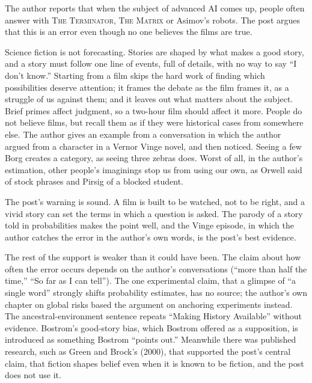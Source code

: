 \begin{afterword}
\summaryhead

The author reports that when the subject of advanced AI comes up, people often answer with \textsc{The Terminator}, \textsc{The Matrix} or Asimov's robots. The post argues that this is an error even though no one believes the films are true.

Science fiction is not forecasting. Stories are shaped by what makes a good story, and a story must follow one line of events, full of details, with no way to say ``I don't know.'' Starting from a film skips the hard work of finding which possibilities deserve attention; it frames the debate as the film frames it, as a struggle of us against them; and it leaves out what matters about the subject. Brief primes affect judgment, so a two-hour film should affect it more. People do not believe films, but recall them as if they were historical cases from somewhere else. The author gives an example from a conversation in which the author argued from a character in a Vernor Vinge novel, and then noticed. Seeing a few Borg creates a category, as seeing three zebras does. Worst of all, in the author's estimation, other people's imaginings stop us from using our own, as Orwell said of stock phrases and Pirsig of a blocked student.

\responsehead

The post's warning is sound. A film is built to be watched, not to be right, and a vivid story can set the terms in which a question is asked. The parody of a story told in probabilities makes the point well, and the Vinge episode, in which the author catches the error in the author's own words, is the post's best evidence.

The rest of the support is weaker than it could have been. The claim about how often the error occurs depends on the author's conversations (``more than half the time,'' ``So far as I can tell''). The one experimental claim, that a glimpse of ``a single word'' strongly shifts probability estimates, has no source; the author's own chapter on global risks based the argument on anchoring experiments instead. The ancestral-environment sentence repeats ``Making History Available'' without evidence. Bostrom's good-story bias, which Bostrom offered as a supposition, is introduced as something Bostrom ``points out.'' Meanwhile there was published research, such as Green and Brock's (2000), that supported the post's central claim, that fiction shapes belief even when it is known to be fiction, and the post does not use it.


\end{afterword}
